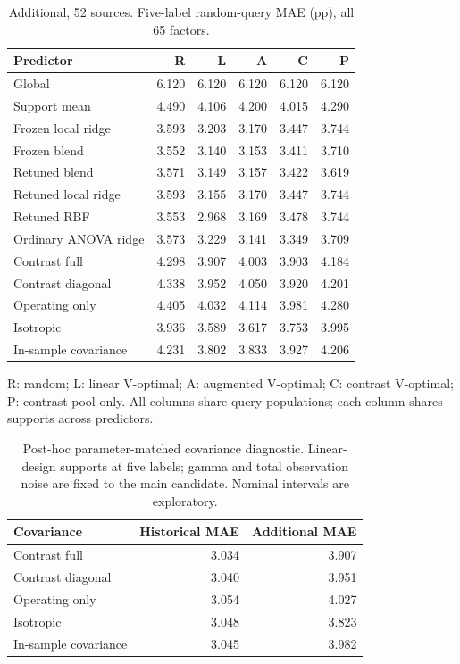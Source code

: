 \documentclass[11pt]{article}
\begin{document}
\begin{table}[htbp]\centering\small\caption{Additional, 52 sources. Five-label random-query MAE (pp), all 65 factors.}\begin{tabular}{lrrrrr}\toprule Predictor & R & L & A & C & P\\\midrule
Global & 6.120 & 6.120 & 6.120 & 6.120 & 6.120\\
Support mean & 4.490 & 4.106 & 4.200 & 4.015 & 4.290\\
Frozen local ridge & 3.593 & 3.203 & 3.170 & 3.447 & 3.744\\
Frozen blend & 3.552 & 3.140 & 3.153 & 3.411 & 3.710\\
Retuned blend & 3.571 & 3.149 & 3.157 & 3.422 & 3.619\\
Retuned local ridge & 3.593 & 3.155 & 3.170 & 3.447 & 3.744\\
Retuned RBF & 3.553 & 2.968 & 3.169 & 3.478 & 3.744\\
Ordinary ANOVA ridge & 3.573 & 3.229 & 3.141 & 3.349 & 3.709\\
Contrast full & 4.298 & 3.907 & 4.003 & 3.903 & 4.184\\
Contrast diagonal & 4.338 & 3.952 & 4.050 & 3.920 & 4.201\\
Operating only & 4.405 & 4.032 & 4.114 & 3.981 & 4.280\\
Isotropic & 3.936 & 3.589 & 3.617 & 3.753 & 3.995\\
In-sample covariance & 4.231 & 3.802 & 3.833 & 3.927 & 4.206\\
\bottomrule\end{tabular}\par\smallskip\footnotesize R: random; L: linear V-optimal; A: augmented V-optimal; C: contrast V-optimal; P: contrast pool-only. All columns share query populations; each column shares supports across predictors.\end{table}
\FloatBarrier\begin{table}[htbp]\centering\small\caption{Post-hoc parameter-matched covariance diagnostic. Linear-design supports at five labels; gamma and total observation noise are fixed to the main candidate. Nominal intervals are exploratory.}\begin{tabular}{lrr}\toprule Covariance & Historical MAE & Additional MAE\\\midrule
Contrast full & 3.034 & 3.907\\
Contrast diagonal & 3.040 & 3.951\\
Operating only & 3.054 & 4.027\\
Isotropic & 3.048 & 3.823\\
In-sample covariance & 3.045 & 3.982\\
\bottomrule\end{tabular}\end{table}
\end{document}
